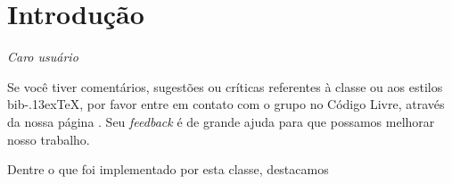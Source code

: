 \documentclass[espaco=simples,appendix=Name]{abnt}
\newcommand{\bibTeX}{bib\kern-.13ex\TeX}%
\newcommand{\ingles}[1]{\textsl{#1}}
\begin{document}
\capa 
\folhaderosto
\sumario

\chapter{Introdução}

\textsl{Caro usuário}

\noindent Se você tiver comentários, sugestões ou críticas referentes à
classe ou aos estilos \bibTeX, por favor entre em contato com o grupo
\abnTeX{} no Código Livre, através da nossa página
.
Seu \ingles{feedback} é de grande ajuda para que possamos melhorar nosso
trabalho.


Dentre o que foi implementado por esta classe, destacamos
\end{document}

